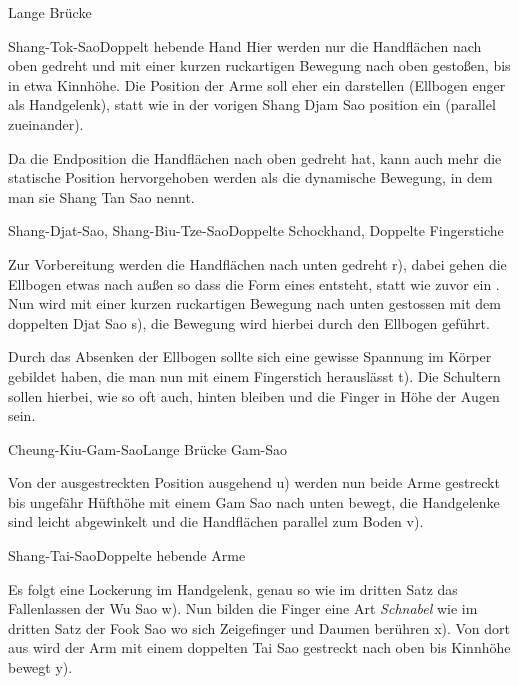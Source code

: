 \begin{WTSatz}{Lange Br\"ucke}
\begin{WTSatzTeil}{Shang-Tok-Sao}{Doppelt hebende Hand}
		Hier werden nur die Handfl\"achen nach oben gedreht und mit einer kurzen ruckartigen Bewegung nach oben gesto{\ss}en, bis in etwa Kinnh\"ohe. Die Position der Arme soll eher ein  darstellen (Ellbogen enger als Handgelenk), statt wie in der vorigen Shang Djam Sao position ein  (parallel zueinander).
		
		Da die Endposition die Handfl\"achen nach oben gedreht hat, kann auch mehr die statische Position hervorgehoben werden als die dynamische Bewegung, in dem man sie Shang Tan Sao nennt.
		
	\end{WTSatzTeil}
	\begin{WTSatzTeil}{Shang-Djat-Sao, Shang-Biu-Tze-Sao}{Doppelte Schockhand, Doppelte Fingerstiche}
		
		Zur Vorbereitung werden die Handfl\"achen nach unten gedreht r), dabei gehen die Ellbogen etwas nach au{\ss}en so dass die Form eines  entsteht, statt wie zuvor ein . Nun wird mit einer kurzen ruckartigen Bewegung nach unten gestossen mit dem doppelten Djat Sao s), die Bewegung wird hierbei durch den Ellbogen gef\"uhrt.
		
		Durch das Absenken der Ellbogen sollte sich eine gewisse Spannung im K\"orper gebildet haben, die man nun mit einem Fingerstich herausl\"asst t). Die Schultern sollen hierbei, wie so oft auch, hinten bleiben und die Finger in H\"ohe der Augen sein.
		
	\end{WTSatzTeil}
	\begin{WTSatzTeil}{Cheung-Kiu-Gam-Sao}{Lange Br\"ucke Gam-Sao}
		
		Von der ausgestreckten Position ausgehend u) werden nun beide Arme gestreckt bis ungef\"ahr H\"ufth\"ohe mit einem Gam Sao nach unten bewegt, die Handgelenke sind leicht abgewinkelt und die Handfl\"achen parallel zum Boden v).
		
	\end{WTSatzTeil}
	\begin{WTSatzTeil}{Shang-Tai-Sao}{Doppelte hebende Arme}
		
		Es folgt eine Lockerung im Handgelenk, genau so wie im dritten Satz das Fallenlassen der Wu Sao w). Nun bilden die Finger eine Art \textit{Schnabel} wie im dritten Satz der Fook Sao wo sich Zeigefinger und Daumen ber\"uhren x). Von dort aus wird der Arm mit einem doppelten Tai Sao gestreckt nach oben bis Kinnh\"ohe bewegt y).
		

\end{WTSatzTeil}
\end{WTSatz}
